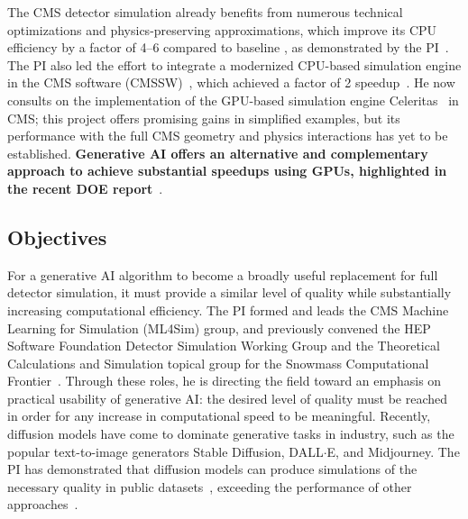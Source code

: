 The CMS detector simulation already benefits from numerous technical optimizations and physics-preserving approximations,
which improve its CPU efficiency by a factor of 4--6 compared to baseline \GEANTfour, as demonstrated by the PI~\cite{Pedro:2019mkq}.
The PI also led the effort to integrate a modernized CPU-based simulation engine in the CMS software (CMSSW)~\cite{Pedro:2020kbk},
which achieved a factor of 2 speedup~\cite{Amadio:2020ink}.
He now consults on the implementation of the GPU-based simulation engine Celeritas~\cite{Tognini:2022nmd} in CMS;
this project offers promising gains in simplified examples, but its performance with the full CMS geometry and physics interactions has yet to be established.
\textbf{Generative AI offers an alternative and complementary approach to achieve substantial speedups using GPUs, highlighted in the recent DOE report}~\cite{AI4SES}.

\subsection{Objectives}\label{subsec:simobj}

For a generative AI algorithm to become a broadly useful replacement for full detector simulation,
it must provide a similar level of quality while substantially increasing computational efficiency.
The PI formed and leads the CMS Machine Learning for Simulation (ML4Sim) group, and previously convened the HEP Software Foundation Detector Simulation Working Group
and the Theoretical Calculations and Simulation topical group for the Snowmass Computational Frontier~\cite{Boyle:2022cvo,Elvira:2022wyn}.
Through these roles, he is directing the field toward an emphasis on practical usability of generative AI:
the desired level of quality must be reached in order for any increase in computational speed to be meaningful.
Recently, diffusion models have come to dominate generative tasks in industry, such as the popular text-to-image generators Stable Diffusion, DALL${\cdot}$E, and Midjourney.
The PI has demonstrated that diffusion models can produce simulations of the necessary quality in public datasets~\cite{Amram:2023onf},
exceeding the performance of other approaches~\cite{Adelmann:2022ozp,Hashemi:2023rgo}.

